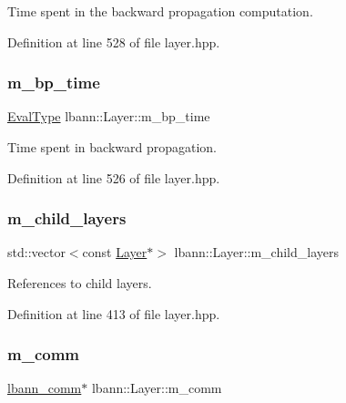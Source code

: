 Time spent in the backward propagation computation. 

Definition at line 528 of file layer.\+hpp.

\mbox{\label{classlbann_1_1Layer_aa60fc41627bcaa9c345775bf5737bb45}} 
\subsubsection{\texorpdfstring{m\+\_\+bp\+\_\+time}{m\_bp\_time}}
{\footnotesize\ttfamily \hyperlink{base_8hpp_a3266f5ac18504bbadea983c109566867}{Eval\+Type} lbann\+::\+Layer\+::m\+\_\+bp\+\_\+time\hspace{0.3cm}{\ttfamily [protected]}}

Time spent in backward propagation. 

Definition at line 526 of file layer.\+hpp.

\mbox{\label{classlbann_1_1Layer_ae348c0d2b4d05f74d809d09debb633c0}} 
\subsubsection{\texorpdfstring{m\+\_\+child\+\_\+layers}{m\_child\_layers}}
{\footnotesize\ttfamily std\+::vector$<$const \hyperlink{classlbann_1_1Layer}{Layer}$\ast$$>$ lbann\+::\+Layer\+::m\+\_\+child\+\_\+layers\hspace{0.3cm}{\ttfamily [protected]}}

References to child layers. 

Definition at line 413 of file layer.\+hpp.

\mbox{\label{classlbann_1_1Layer_a5de05c52f22e0bbd7c703bec3ad4dbf2}} 
\subsubsection{\texorpdfstring{m\+\_\+comm}{m\_comm}}
{\footnotesize\ttfamily \hyperlink{classlbann_1_1lbann__comm}{lbann\+\_\+comm}$\ast$ lbann\+::\+Layer\+::m\+\_\+comm\hspace{0.3cm}{\ttfamily [protected]}}

